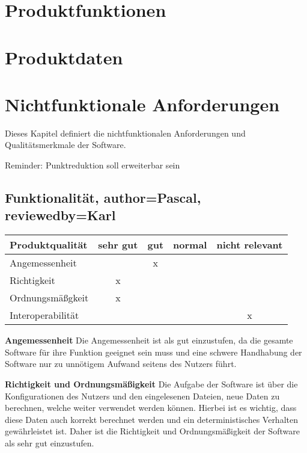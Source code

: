 \documentclass[parskip=full]{scrartcl} %
\begin{document}
\section{Produktfunktionen}
\newpage







\section{Produktdaten}
\newpage







\section{Nichtfunktionale Anforderungen}

Dieses Kapitel definiert die nichtfunktionalen Anforderungen und Qualitätsmerkmale der Software.

Reminder: Punktreduktion soll erweiterbar sein



\subsection{Funktionalität, author=Pascal, reviewedby=Karl}

\begin{tabular}{|l| c| c| c| c|}
    \hline
        Produktqualität & sehr gut & gut & normal & nicht relevant \\
    \hline
        Angemessenheit & & x & &\\
    \hline
        Richtigkeit & x & & &\\
    \hline
        Ordnungsmäßgkeit & x & & &\\
    \hline
        Interoperabilität & & & & x\\
    \hline
        
    \end{tabular}

\textbf{Angemessenheit}
\newline
Die Angemessenheit ist als gut einzustufen, da die gesamte Software für ihre Funktion geeignet sein muss und eine schwere Handhabung der Software nur zu unnötigem Aufwand seitens des Nutzers führt.



\textbf{Richtigkeit und Ordnungsmäßigkeit}
\newline
Die Aufgabe der Software ist über die Konfigurationen des Nutzers und den eingelesenen Dateien, neue Daten zu berechnen, welche weiter verwendet werden können. Hierbei ist es wichtig, dass diese Daten auch korrekt berechnet werden und ein deterministisches Verhalten gewährleistet ist.
Daher ist die Richtigkeit und Ordnungsmäßigkeit der Software als sehr gut einzustufen.
\end{document}
